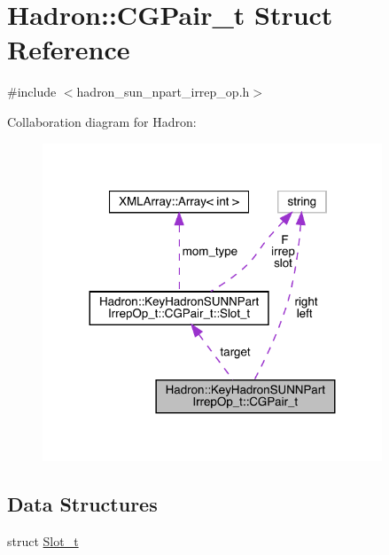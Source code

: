 \hypertarget{structHadron_1_1KeyHadronSUNNPartIrrepOp__t_1_1CGPair__t}{}\section{Hadron\+:\+:C\+G\+Pair\+\_\+t Struct Reference}
\label{structHadron_1_1KeyHadronSUNNPartIrrepOp__t_1_1CGPair__t}


{\ttfamily \#include $<$hadron\+\_\+sun\+\_\+npart\+\_\+irrep\+\_\+op.\+h$>$}



Collaboration diagram for Hadron\+:\nopagebreak
\begin{figure}[H]
\begin{center}
\leavevmode
\includegraphics[width=287pt]{d0/d3e/structHadron_1_1KeyHadronSUNNPartIrrepOp__t_1_1CGPair__t__coll__graph}
\end{center}
\end{figure}
\subsection*{Data Structures}
\begin{DoxyCompactItemize}
\item 
struct \mbox{\hyperlink{structHadron_1_1KeyHadronSUNNPartIrrepOp__t_1_1CGPair__t_1_1Slot__t}{Slot\+\_\+t}}
\end{DoxyCompactItemize}

